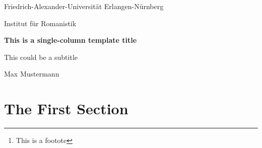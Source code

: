 \documentclass[11pt, a4paper]{article}
\begin{document}
\begin{center}
  Friedrich-Alexander-Universität Erlangen-Nürnberg

  Institut für Romanistik

  \vspace{0.4cm}

  \Large \textbf{This is a single-column template title}

  \vspace{0.1cm} \small{This could be a subtitle}

  \vspace{0.4cm} \small{Max Mustermann}
  \vspace{1cm}
\end{center}

\tableofcontents
\thispagestyle{empty}
\pagestyle{empty}


\begin{abstract}

Lorem ipsum dolor sit amet, consectetur adipiscing elit. Aenean id blandit odio. Donec sit amet dui at dui interdum blandit. Mauris imperdiet augue non sollicitudin suscipit. Proin et mauris nec elit eleifend iaculis at ultrices sapien. Etiam venenatis mi ac nisi vestibulum vulputate. Morbi facilisis euismod dapibus. Integer consectetur nibh vel lectus pharetra finibus. Quisque interdum diam a purus condimentum, pulvinar egestas felis volutpat\footnote{This is a footote}.

Nulla facilisi. Nunc porttitor eros mi, ac feugiat felis placerat eget. Vestibulum mi lacus, eleifend in laoreet nec, gravida sed massa. Nunc gravida, sapien vitae gravida suscipit, purus quam tristique sapien, ac scelerisque velit ligula non neque. Curabitur pretium lectus in dapibus consequat. Maecenas semper non mi molestie hendrerit. Integer dictum neque nibh, sit amet bibendum risus mattis a.

Nunc at lobortis orci. Praesent varius enim vestibulum sapien efficitur egestas. Lorem ipsum dolor sit amet, consectetur adipiscing elit. Proin dictum elit a urna ultrices varius. Donec sed consectetur magna. Phasellus suscipit erat ante. Aenean metus orci, faucibus sit amet tortor a, porta dapibus neque. Curabitur pulvinar ultricies nisl, in finibus leo auctor in.

\end{abstract}


\section{The First Section}
\end{document}
